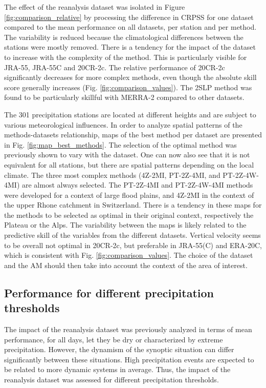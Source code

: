 \documentclass{ametsoc}
\begin{document}
The effect of the reanalysis dataset was isolated in Figure \ref{fig:comparison_relative} by processing the difference in CRPSS for one dataset compared to the mean performance on all datasets, per station and per method. The variability is reduced because the climatological differences between the stations were mostly removed. There is a tendency for the impact of the dataset to increase with the complexity of the method. This is particularly visible for JRA-55, JRA-55C and 20CR-2c. The relative performance of 20CR-2c significantly decreases for more complex methods, even though the absolute skill score generally increases (Fig. \ref{fig:comparison_values}). The 2SLP method was found to be particularly skillful with MERRA-2 compared to other datasets. 

The 301 precipitation stations are located at different heights and are subject to various meteorological influences. In order to analyze spatial patterns of the methods-datasets relationship, maps of the best method per dataset are presented in Fig. \ref{fig:map_best_methods}. The selection of the optimal method was previously shown to vary with the dataset. One can now also see that it is not equivalent for all stations, but there are spatial patterns depending on the local climate. The three most complex methods (4Z-2MI, PT-2Z-4MI, and PT-2Z-4W-4MI) are almost always selected. The PT-2Z-4MI and PT-2Z-4W-4MI methods were developed for a context of large flood plains, and 4Z-2MI in the context of the upper Rhone catchment in Switzerland. There is a tendency in these maps for the methods to be selected as optimal in their original context, respectively the Plateau or the Alps. The variability between the maps is likely related to the predictive skill of the variables from the different datasets. Vertical velocity seems to be overall not optimal in 20CR-2c, but preferable in JRA-55(C) and ERA-20C, which is consistent with Fig. \ref{fig:comparison_values}. The choice of the dataset and the AM should then take into account the context of the area of interest.


\subsection{Performance for different precipitation thresholds}

The impact of the reanalysis dataset was previously analyzed in terms of mean performance, for all days, let they be dry or characterized by extreme precipitation. However, the dynamism of the synoptic situation can differ significantly between these situations. High precipitation events are expected to be related to more dynamic systems in average. Thus, the impact of the reanalysis dataset was assessed for different precipitation thresholds.
\end{document}
